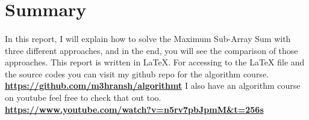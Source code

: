 \section*{Summary}
\paragraph{}
In this report, I will explain how to solve 
the Maximum Sub-Array Sum with three different 
approaches, and in the end, you will see the 
comparison of those approaches.
This report is written in \LaTeX. For accessing
to the LaTeX file and the source codes you can 
visit my github repo for the algorithm course.
\newline
\newline
\href{https://github.com/m3hransh/algorithm}{\textbf{https://github.com/m3hransh/algorithmt}}
\newline
\newline
I also have an algorithm course on youtube feel
free to check that out too.
\newline
\newline
\href{https://www.youtube.com/watch?v=n5rv7pbJpmM&t=256s}{\textbf{https://www.youtube.com/watch?v=n5rv7pbJpmM\&t=256s}}